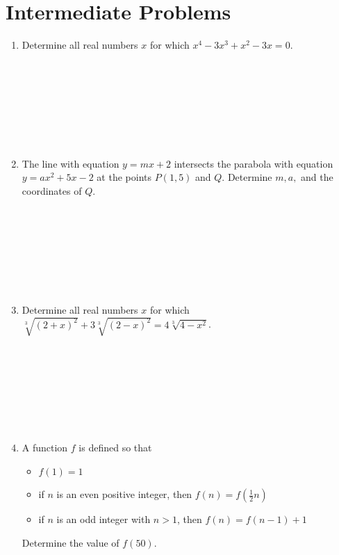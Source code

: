 \documentclass[12pt]{article}
\newcommand{\interspace}{\\ \\ \\ \\ \\ \\ \\ \\}
\begin{document}
\section*{Intermediate Problems}
\begin{enumerate}
    \item Determine all real numbers $x$ for which $x^4 - 3x^3 + x^2 - 3x = 0$. \interspace
    
    \item The line with equation $y = mx + 2$ intersects the parabola with equation $y = ax^2 + 5x - 2$ at the points $P(1, 5)$ and $Q$. Determine $m, a,$ and the coordinates of $Q$. \interspace
    
    \item Determine all real numbers $x$ for which $\sqrt[3]{(2 + x)^2} + 3\sqrt[3]{(2 - x)^2} = 4\sqrt[3]{4-x^2}$. \interspace
    
    \item A function $f$ is defined so that
    \begin{itemize}
        \item $f(1) = 1$
        \item if $n$ is an even positive integer, then $f(n) = f(\frac{1}{2}n)$
        \item if $n$ is an odd integer with $n > 1$, then $f(n) = f(n - 1) + 1$
    \end{itemize} Determine the value of $f(50)$. \interspace
\end{enumerate} \newpage
\end{document}
